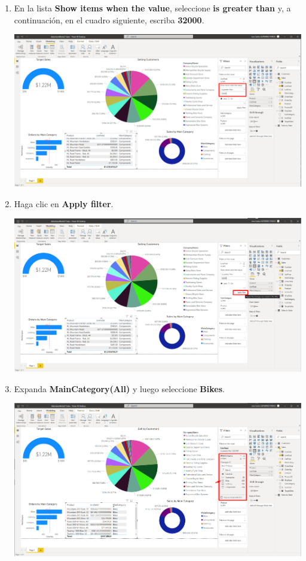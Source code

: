 \documentclass[12pt,letterpaper]{article}
\newcommand\tab[1][1cm]{\hspace*{#1}}
\begin{document}
\begin{enumerate}[\tab 1.]
\begin{center}
        \end{center}
        \item En la lista \textbf{Show items when the value}, seleccione \textbf{is greater than} y, a continuación, en el cuadro siguiente, escriba \textbf{32000}.
        \begin{center}
            \includegraphics[width=13cm]{./img/img108.png}
        \end{center}
        \item Haga clic en \textbf{Apply filter}.
        \begin{center}
            \includegraphics[width=13cm]{./img/img109.png}
        \end{center}
        \item Expanda \textbf{MainCategory(All)} y luego seleccione \textbf{Bikes}.
        \begin{center}
            \includegraphics[width=13cm]{./img/img110.png}

\end{center}
\end{enumerate}
\end{document}
